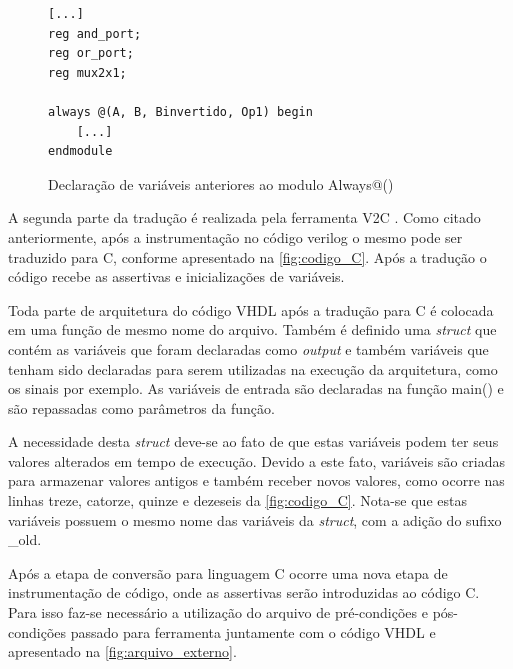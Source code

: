\begin{figure}[H]
\caption{\label{fig:codigo_verilog_always} Declaração de variáveis anteriores ao modulo Always@()}
	\begin{center}
    \begin{minipage}{0.7\textwidth}
    \begin{lstlisting}
[...]
reg and_port;
reg or_port;
reg mux2x1;

always @(A, B, Binvertido, Op1) begin
    [...]
endmodule
    \end{lstlisting}
    \end{minipage}
	\end{center}
\end{figure}

\par


\par
A segunda parte da tradução é realizada pela ferramenta V2C \cite{mukherjee2016v2c}. Como citado anteriormente, após a instrumentação no código verilog o mesmo pode ser traduzido para C, conforme apresentado na \autoref{fig:codigo_C}. Após a tradução o código recebe as assertivas e inicializações de variáveis.  

\par
Toda parte de arquitetura do código VHDL após a tradução para C é colocada em uma função de mesmo nome do arquivo. Também é definido uma \textit{struct} que contém as variáveis que foram declaradas como \textit{output} e também variáveis que tenham sido declaradas para serem utilizadas na execução da arquitetura, como os sinais por exemplo. As variáveis de entrada são declaradas na função main() e são repassadas como parâmetros da função. 

\par
A necessidade desta \textit{struct} deve-se ao fato de que estas variáveis podem ter seus valores alterados em tempo de execução. Devido a este fato, variáveis são criadas para armazenar valores antigos e também receber novos valores, como ocorre nas linhas treze, catorze, quinze e dezeseis da \autoref{fig:codigo_C}. Nota-se que estas variáveis possuem o mesmo nome das variáveis da \textit{struct}, com a adição do sufixo \_old. 

\par
Após a etapa de conversão para linguagem C ocorre uma nova etapa de instrumentação de código, onde as assertivas serão introduzidas ao código C. Para isso faz-se necessário a utilização do arquivo de pré-condições e pós-condições passado para ferramenta juntamente com o código VHDL e apresentado na \autoref{fig:arquivo_externo}.  

